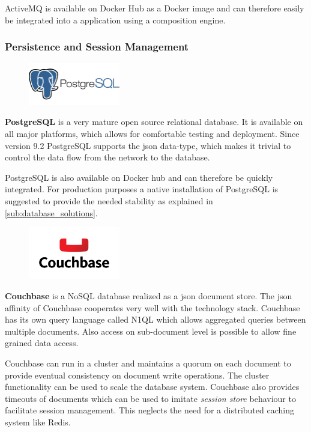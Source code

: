 ActiveMQ is available on Docker Hub as a Docker image and can therefore easily
be integrated into a \ms{} application using a composition engine.


\subsubsection{Persistence and Session Management}

\begin{figure}
 	\hspace*{0.4cm}
    \includegraphics[width=4cm]{images/dependencies/PostgreSQL}
\end{figure}

\textbf{PostgreSQL} is a very mature open source relational database. It is
available on all major platforms, which allows for comfortable testing and
deployment. Since version 9.2 PostgreSQL supports the \gls{json} data-type,
which makes it trivial to control the data flow from the network to the database.

PostgreSQL is also available on Docker hub and can therefore be quickly
integrated. For production purposes a native installation of PostgreSQL is
suggested to provide the needed stability as explained in
\autoref{sub:database_solutions}.\\ 


\begin{figure}
    \includegraphics[width=4cm]{images/dependencies/couchbase}
\end{figure}

\noindent \textbf{Couchbase} is a NoSQL database realized as a \gls{json}
document store. The \gls{json} affinity of Couchbase cooperates very well with
the technology stack. Couchbase has its own query language called N1QL which
allows aggregated queries between multiple documents. Also access on
sub-document level is possible to allow fine grained data access.

Couchbase can run in a cluster and maintains a quorum on each document to
provide eventual consistency on document write operations. The cluster
functionality can be used to scale the database system. Couchbase also provides
timeouts of documents which can be used to imitate \textit{session store}
behaviour to facilitate session management. This neglects the need for a
distributed caching system like Redis.

